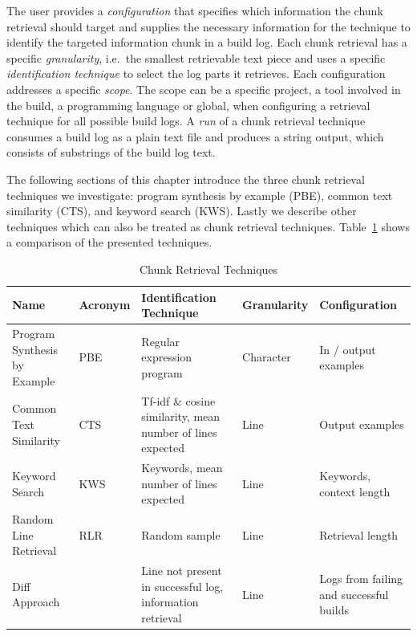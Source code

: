 \documentclass[\myrootdir/main.tex]{subfiles}
\begin{document}
The user provides a \textit{configuration} that specifies which information the chunk retrieval should target and supplies the necessary information for the technique to identify the targeted information chunk in a build log.
Each chunk retrieval has a specific \textit{granularity}, i.e.\ the smallest retrievable text piece and uses a specific \textit{identification technique} to select the log parts it retrieves.
Each configuration addresses a specific \textit{scope}.
The scope can be a specific project, a tool involved in the build, a programming language or global, when configuring a retrieval technique for all possible build logs.
A \emph{run} of a chunk retrieval technique consumes a build log as a plain text file and produces a string output, which consists of substrings of the build log text.

The following sections of this chapter introduce the three chunk retrieval techniques we investigate: program synthesis by example (PBE), common text similarity (CTS), and keyword search (KWS).
Lastly we describe other techniques which can also be treated as chunk retrieval techniques.
Table~\ref{tab:ctr} shows a comparison of the presented techniques.

\begin{table}[htbp]
\centering
\caption{Chunk Retrieval Techniques}
\begin{tabularx}{\textwidth}{@{}XlXlX@{}} 
\toprule
Name                         & Acronym & Identification Technique                                   & Granularity & Configuration             \\ 
\midrule
Program Synthesis by Example & PBE     & Regular expression program                                 & Character   & In / output examples      \\
Common Text Similarity       & CTS     & Tf-idf \& cosine similarity, mean number of lines expected & Line        & Output examples           \\
Keyword Search               & KWS     & Keywords, mean number of lines expected                    & Line        & Keywords, context length  \\
Random Line Retrieval        & RLR     & Random sample                                              & Line        & Retrieval length          \\
Diff Approach                &         & Line not present in successful log, information retrieval  & Line        & Logs from failing and successful builds      \\
\bottomrule
\end{tabularx}
\label{tab:ctr}
\end{table}
\end{document}
